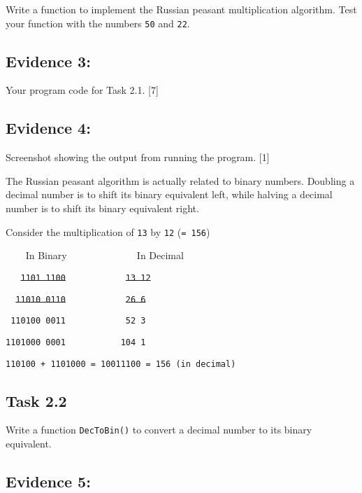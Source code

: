 Write a function to implement the Russian peasant multiplication algorithm.
Test your function with the numbers \texttt{50} and \texttt{22}. 

\subsection*{Evidence 3: }

Your program code for Task 2.1. \hfill{} {[}7{]}

\subsection*{Evidence 4: }

Screenshot showing the output from running the program. \hfill{}
{[}1{]}

The Russian peasant algorithm is actually related to binary numbers.
Doubling a decimal number is to shift its binary equivalent left,
while halving a decimal number is to shift its binary equivalent right. 

Consider the multiplication of \texttt{13} by \texttt{12} (\texttt{=
156}) 

\noindent\begin{minipage}[t]{1\columnwidth}%
\texttt{~~~~}In Binary\texttt{ ~~~~~~~~~~~~~}In Decimal\texttt{ }

\texttt{~~~}\texttt{\sout{1101 1100}}\texttt{ ~~~~~~~~~~~}\texttt{\sout{13
12}}\texttt{ }

\texttt{~ }\texttt{\sout{11010 0110}}\texttt{ ~~~~~~~~~~~}\texttt{\sout{26
6}}\texttt{ }

\texttt{~110100 0011 ~~~~~~~~~~~52 3}

\texttt{1101000 0001 ~~~~~~~~~~104 1 }

\bigskip{}

\texttt{110100 + 1101000 = 10011100 = 156 (in decimal) }%
\end{minipage}

\subsection*{Task 2.2 }

Write a function \texttt{DecToBin()} to convert a decimal number to
its binary equivalent.

\subsection*{Evidence 5: }


